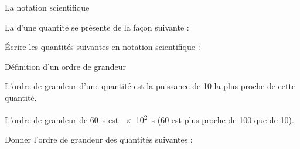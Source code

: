 \begin{doc}{La notation scientifique}
  \begin{importants}
    La  d'une quantité se présente de la façon suivante :
    \begin{center}
      \qq{}
      \qq{}
    \end{center}
    \vspace*{-30pt} \hspace*{4pt}
  \end{importants}
\end{doc}

\numeroQuestion Écrire les quantités suivantes en notation scientifique :
  



\begin{doc}{Définition d'un ordre de grandeur}

  \vAligne{-36pt}
  \begin{importants}
    L'ordre de grandeur d'une quantité est la puissance de 10 la plus proche de cette quantité.
  \end{importants}
  \exemple L'ordre de grandeur de \qty{60}{\s} est \qty{e2}{\s} (60 est plus proche de 100 que de 10).
\end{doc}


\newpage
\vspace*{-28pt}
\numeroQuestion Donner l'ordre de grandeur des quantités suivantes :

